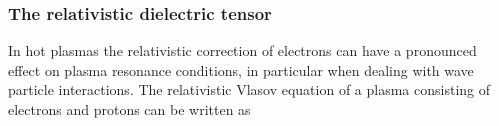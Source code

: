 \documentclass[a4paper,11pt]{thesis}
\begin{document}







\subsubsection{The relativistic dielectric tensor}
In hot plasmas the relativistic correction of electrons can have a pronounced effect on plasma resonance conditions, in particular when dealing with wave particle interactions. The relativistic Vlasov equation of a plasma consisting of electrons and protons can be written as
\end{document}
